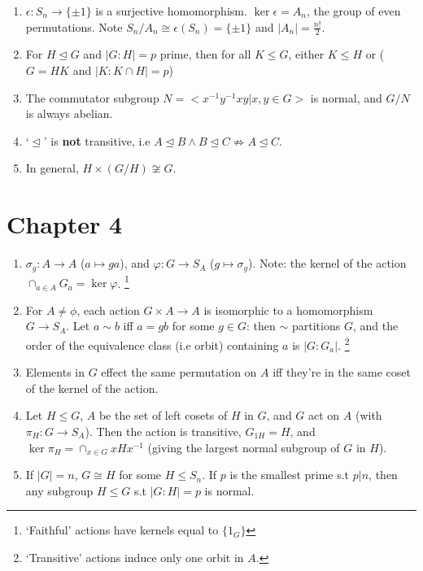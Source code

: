 \documentclass{article}
\newcommand{\normin}{\trianglelefteq}
\begin{document}
\begin{enumerate}[1.]
{            immediately giving $\epsilon(\sigma) = Parity(m-1)$.}
        ) is representation-independent.
    \item $\epsilon : S_n \rightarrow \{\pm 1\}$ is a surjective
        homomorphism. $\ker \epsilon = A_n$, the group of even permutations.
        Note $S_n/A_n \cong \epsilon(S_n) = \{\pm 1\}$ and $|A_n| =
        \frac{n!}{2}$.
    \item For $H \trianglelefteq G$ and $|G : H| = p$ prime, then for all $K
    \leq G$, either $K \leq H$ or ($G = HK$ and $|K:K \cap H| = p$)
    \item The commutator subgroup $N = <x^{-1}y^{-1}xy | x, y \in G>$ is normal,
    and $G/N$ is always abelian.
    \item `$\trianglelefteq$' is \textbf{not} transitive, i.e $A \normin B 
        \wedge B \normin C \not\Rightarrow A \normin C$.
    \item In general, $H \times (G / H) \not\cong G$.
\end{enumerate}

\section*{Chapter 4}

\begin{enumerate}[1.]
    \item $\sigma_g : A \rightarrow A$ ($a \mapsto ga$), and
        $\varphi : G \rightarrow S_A$ ($g \mapsto \sigma_g$).
        Note: the kernel of the action $\cap_{a \in A} G_a = \ker \varphi$.
        \footnote{`Faithful' actions have kernels equal to $\{1_G\}$}
    \item For $A \not= \phi$, each action $G \times A \rightarrow A$ is
        isomorphic to a homomorphism $G \rightarrow S_A$. Let $a \sim b$ iff $a
        = gb$ for some $g \in G$: then $\sim$ partitions $G$, and the order
        of the equivalence class (i.e orbit) containing $a$ is $|G : G_a|$.
        \footnote{`Transitive' actions induce only one orbit in $A$.}
    \item Elements in $G$ effect the same permutation on $A$ iff they're in
        the same coset of the kernel of the action.
    \item Let $H \leq G$, $A$ be the set of left cosets of $H$ in $G$, and
        $G$ act on $A$ (with $\pi_H : G \rightarrow S_A$). Then the action
        is transitive, $G_{1H} = H$, and $\ker \pi_H = \cap_{x \in G}
        xHx^{-1}$ (giving the largest normal subgroup of $G$ in $H$).
    \item If $|G| = n$, $G \cong H$ for some $H \leq S_n$. If $p$ is the
        smallest prime s.t $p | n$, then any subgroup $H \leq G$ s.t $|G :
        H| = p$ is normal.
\end{enumerate}
\end{document}
